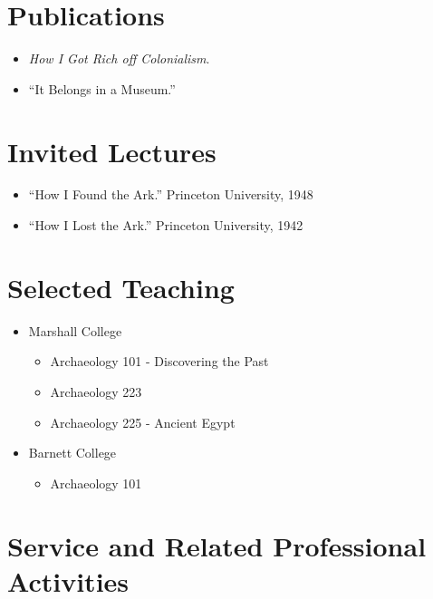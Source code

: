 \documentclass[margin,line]{res}
\def\tightlist{} %
\renewcommand{\subsection}[1]{\section{#1}}
\begin{document}
\begin{resume}
{\subsection{Publications}\label{publications}}

\begin{itemize}
\tightlist
\item
  \emph{How I Got Rich off Colonialism}.
\item
  ``It Belongs in a Museum.''
\end{itemize}

\hypertarget{invited-lectures}{%
\subsection{Invited Lectures}\label{invited-lectures}}

\begin{itemize}
\tightlist
\item
  ``How I Found the Ark.'' Princeton University, 1948
\item
  ``How I Lost the Ark.'' Princeton University, 1942
\end{itemize}

\hypertarget{selected-teaching}{%
\subsection{Selected Teaching}\label{selected-teaching}}

\begin{itemize}
\tightlist
\item
  Marshall College

  \begin{itemize}
  \tightlist
  \item
    Archaeology 101 - Discovering the Past
  \item
    Archaeology 223
  \item
    Archaeology 225 - Ancient Egypt
  \end{itemize}
\item
  Barnett College

  \begin{itemize}
  \tightlist
  \item
    Archaeology 101
  \end{itemize}
\end{itemize}

\hypertarget{service-and-related-professional-activities}{%
\subsection{Service and Related Professional
Activities}\label{service-and-related-professional-activities}}


\end{resume}
\end{document}
